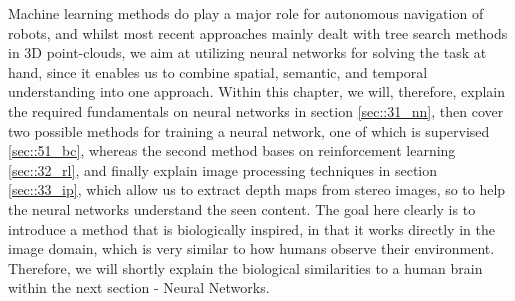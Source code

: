 \FloatBarrier
\label{sec::3_ml}





Machine learning methods do play a major role for autonomous navigation of robots, and whilst most recent approaches mainly dealt with tree search methods in 3D point-clouds, we aim at utilizing neural networks for solving the task at hand, since it enables us to combine spatial, semantic, and temporal understanding into one approach. Within this chapter, we will, therefore, explain the required fundamentals on neural networks in section \ref{sec::31_nn}, then cover two possible methods for training a neural network, one of which is supervised \ref{sec::51_bc}, whereas the second method bases on reinforcement learning \ref{sec::32_rl}, and finally explain image processing techniques in section \ref{sec::33_ip}, which allow us to extract depth maps from stereo images, so to help the neural networks understand the seen content. The goal here clearly is to introduce a method that is biologically inspired, in that it works directly in the image domain, which is very similar to how humans observe their environment. Therefore, we will shortly explain the biological similarities to a human brain within the next section - Neural Networks.